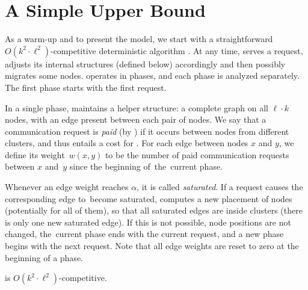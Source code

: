 
\section{A Simple Upper Bound}
\label{sec:upper}

As a warm-up and to present the model, we start with a straightforward $O(k^2
\cdot \ell^2)$-competitive deterministic algorithm \DET. At any time, \DET
serves a request, adjusts its internal structures (defined below)
accordingly and then possibly migrates some nodes. \DET operates in phases, and each
phase is analyzed separately. The first phase starts with the first request.

In a single phase, \DET maintains a helper structure: a complete graph on all
$\ell \cdot k$ nodes, with an edge present between each pair of nodes. We say
that a communication request is \emph{paid} (by \DET) if it occurs between
nodes from different clusters, and thus entails a cost for \DET. For each edge
between nodes $x$ and $y$, we define its weight~$w(x,y)$ to be the number of
paid communication requests between $x$ and~$y$ since the beginning of~the~current phase.

Whenever an edge weight reaches $\alpha$, it is called \emph{saturated}. If a
request causes the corresponding edge to~become saturated,
\DET computes a new placement of nodes (potentially for all of them), so that all
saturated edges are inside clusters (there is only one new saturated edge). If
this is not possible, node positions are not changed, the~current phase ends
with the current request, and a new phase begins with the next request. Note
that all edge weights are reset to zero at the beginning of a phase.


\begin{theorem}
\DET is $O(k^2 \cdot \ell^2)$-competitive.
\end{theorem}

